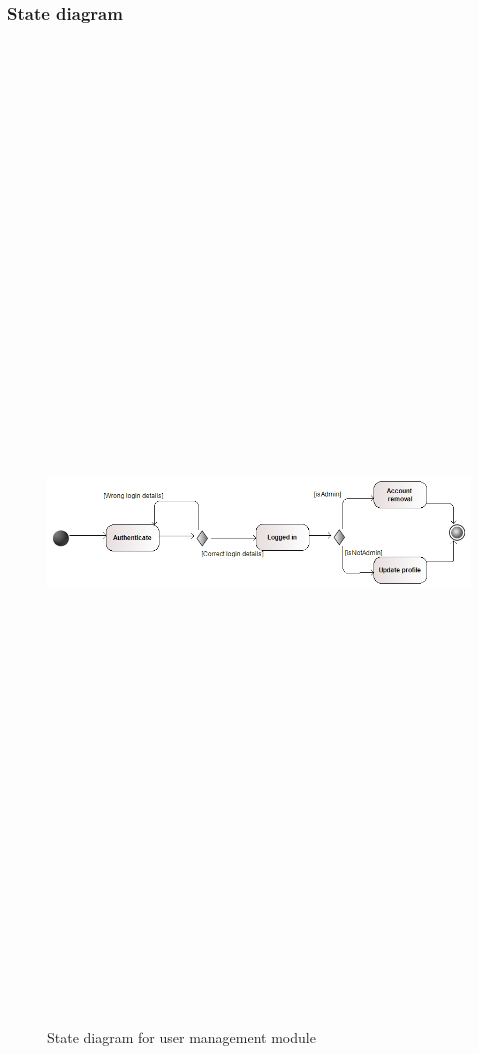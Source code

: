 \subsubsection{State diagram}
\begin{figure}[H]
	\includegraphics[width=12cm,height=26cm,keepaspectratio]{Users/Pictures/User_State_Diagram.png}
	\caption{State diagram for user management module}\label{visina8}
\end{figure}
